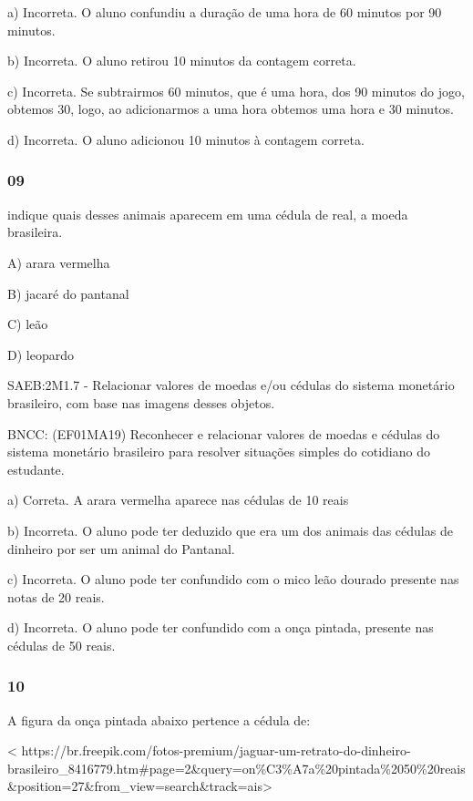 a) Incorreta. O aluno confundiu a duração de uma hora de 60 minutos por
90 minutos.

b) Incorreta. O aluno retirou 10 minutos da contagem correta.

c) Incorreta. Se subtrairmos 60 minutos, que é uma hora, dos 90 minutos
do jogo, obtemos 30, logo, ao adicionarmos a uma hora obtemos uma hora e
30 minutos.

d) Incorreta. O aluno adicionou 10 minutos à contagem correta.

\subsubsection{09}\label{section-140}

indique quais desses animais aparecem em uma cédula de real, a moeda
brasileira.

A) arara vermelha

B) jacaré do pantanal

C) leão

D) leopardo

SAEB:2M1.7 - Relacionar valores de moedas e/ou cédulas do sistema
monetário brasileiro, com base nas imagens desses objetos.

BNCC: (EF01MA19) Reconhecer e relacionar valores de moedas e cédulas do
sistema monetário brasileiro para resolver situações simples do
cotidiano do estudante.

a) Correta. A arara vermelha aparece nas cédulas de 10 reais

b) Incorreta. O aluno pode ter deduzido que era um dos animais das
cédulas de dinheiro por ser um animal do Pantanal.

c) Incorreta. O aluno pode ter confundido com o mico leão dourado
presente nas notas de 20 reais.

d) Incorreta. O aluno pode ter confundido com a onça pintada, presente
nas cédulas de 50 reais.

\subsubsection{10 }\label{section-141}

A figura da onça pintada abaixo pertence a cédula de:

\textless{}
https://br.freepik.com/fotos-premium/jaguar-um-retrato-do-dinheiro-brasileiro\_8416779.htm\#page=2\&query=on\%C3\%A7a\%20pintada\%2050\%20reais\&position=27\&from\_view=search\&track=ais\textgreater{}

